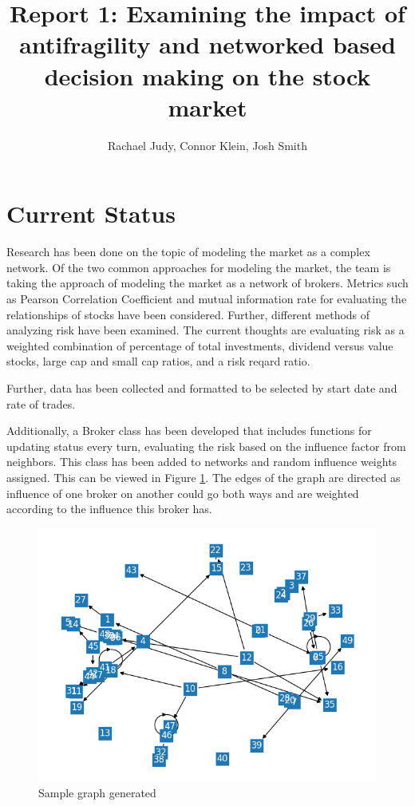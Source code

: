 \documentclass[letterpaper, 10 pt, proceedings]{ieeetran}  %
\title{\LARGE \bf
	Report 1: Examining the impact of antifragility and networked based decision making on the stock market
}
\author{Rachael Judy, Connor Klein, Josh Smith%
}
\begin{document}
	
	\maketitle
	\thispagestyle{empty}
	\pagestyle{empty}
	
	
	\section{Current Status}
	Research has been done on the topic of modeling the market as a complex network. Of the two common approaches for modeling the market, the team is taking the approach of modeling the market as a network of brokers. Metrics such as Pearson Correlation Coefficient and mutual information rate for evaluating the relationships of stocks have been considered. Further, different methods of analyzing risk have been examined. The current thoughts are evaluating risk as a weighted combination of percentage of total investments, dividend versus value stocks, large cap and small cap ratios, and a risk reqard ratio. 
	
	
	Further, data has been collected and formatted to be selected by start date and rate of trades. 
	
	Additionally, a Broker class has been developed that includes functions for updating status every turn, evaluating the risk based on the influence factor from neighbors. This class has been added to networks and random influence weights assigned. This can be viewed in Figure \ref{samplegraph}. The edges of the graph are directed as influence of one broker on another could go both ways and are weighted according to the influence this broker has.  
	
	\begin{figure}
		\includegraphics[width=.5\textwidth]{samplegraph.png}
		\caption{Sample graph generated}
		\label{samplegraph}
	\end{figure}
	
\end{document}
